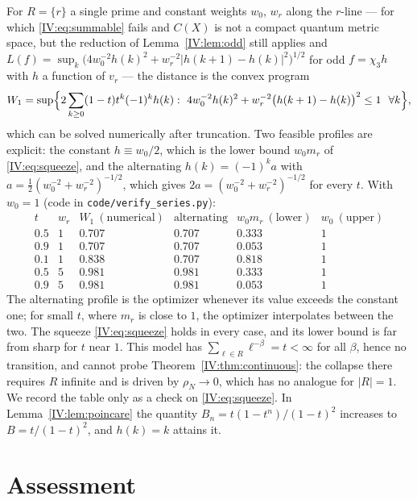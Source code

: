 \begin{remark}\label{IV:rem:numerics}
For $R=\{r\}$ a single prime and constant weights $w_0$, $w_r$ along the $r$-line ---
for which \eqref{IV:eq:summable} fails and $C(X)$ is not a compact quantum metric space, but
the reduction of Lemma~\ref{IV:lem:odd} still applies and $L(f)=\sup_k\bigl(4w_0^{-2}h(k)^2+w_r^{-2}|h(k+1)-h(k)|^2\bigr)^{1/2}$
for odd $f=\chi_3h$ with $h$ a function of $v_r$ --- the distance is the convex program
\[
W_1=\sup\Bigl\{2\sum_{k\ge0}(1-t)t^k(-1)^kh(k):\ 4w_0^{-2}h(k)^2+w_r^{-2}\bigl(h(k+1)-h(k)\bigr)^2\le1\ \ \forall k\Bigr\},
\]
which can be solved numerically after truncation. Two feasible profiles are explicit: the
constant $h\equiv w_0/2$, which is the lower bound $w_0m_r$ of \eqref{IV:eq:squeeze}, and the
alternating $h(k)=(-1)^ka$ with $a=\tfrac12(w_0^{-2}+w_r^{-2})^{-1/2}$, which gives
$2a=(w_0^{-2}+w_r^{-2})^{-1/2}$ for every $t$. With $w_0=1$ (code in \texttt{code/verify\_series.py}):
\[
\begin{array}{cccccc}
t & w_r & W_1\ (\text{numerical}) & \text{alternating} & w_0m_r\ (\text{lower}) & w_0\ (\text{upper})\\\hline
0.5 & 1 & 0.707 & 0.707 & 0.333 & 1\\
0.9 & 1 & 0.707 & 0.707 & 0.053 & 1\\
0.1 & 1 & 0.838 & 0.707 & 0.818 & 1\\
0.5 & 5 & 0.981 & 0.981 & 0.333 & 1\\
0.9 & 5 & 0.981 & 0.981 & 0.053 & 1
\end{array}
\]
The alternating profile is the optimizer whenever its value exceeds the constant one; for
small $t$, where $m_r$ is close to $1$, the optimizer interpolates between the two. The
squeeze \eqref{IV:eq:squeeze} holds in every case, and its lower bound is far from sharp for
$t$ near $1$. This model has $\sum_{\ell\in R}\ell^{-\beta}=t<\infty$ for all $\beta$, hence
no transition, and cannot probe Theorem~\ref{IV:thm:continuous}: the collapse there requires
$R$ infinite and is driven by $\rho_N\to0$, which has no analogue for $|R|=1$. We record
the table only as a check on \eqref{IV:eq:squeeze}. In Lemma~\ref{IV:lem:poincare} the quantity
$B_n=t(1-t^n)/(1-t)^2$ increases to $B=t/(1-t)^2$, and $h(k)=k$ attains it.
\end{remark}

\section{Assessment}

